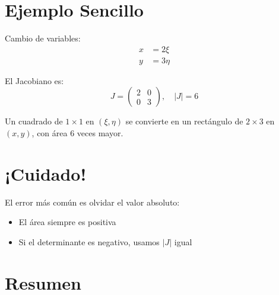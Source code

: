 \documentclass{article}
\begin{document}
\section{Ejemplo Sencillo}

Cambio de variables:
\begin{align*}
x &= 2\xi \\
y &= 3\eta
\end{align*}

El Jacobiano es:
\[
J = \begin{pmatrix}
2 & 0 \\
0 & 3
\end{pmatrix}, \quad |J| = 6
\]

Un cuadrado de $1 \times 1$ en $(\xi,\eta)$ se convierte en un rectángulo de $2 \times 3$ en $(x,y)$, con área 6 veces mayor.

\section{¡Cuidado!}

El error más común es olvidar el valor absoluto:
\begin{itemize}
\item El área siempre es positiva
\item Si el determinante es negativo, usamos $|J|$ igual
\end{itemize}

\section{Resumen}

\begin{center}
\end{center}
\end{document}
